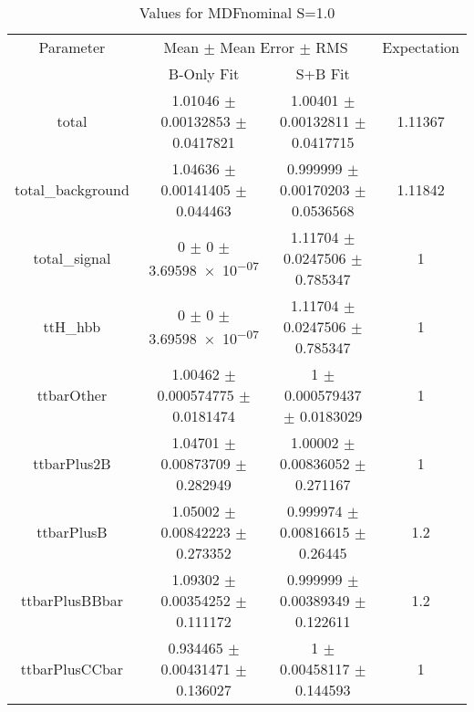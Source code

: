 \begin{table}
\centering
\caption{Values for MDFnominal S=1.0}
\begin{tabular}{cccc}
\toprule
Parameter & \multicolumn{2}{c}{Mean $\pm$ Mean Error $\pm$ RMS} & Expectation\\
 & B-Only Fit & S+B Fit & \\
\midrule
total & \num{1.01046} $\pm$ \num{0.00132853} $\pm$ \num{0.0417821} & \num{1.00401} $\pm$ \num{0.00132811} $\pm$ \num{0.0417715} & \num{1.11367}\\
total\_background & \num{1.04636} $\pm$ \num{0.00141405} $\pm$ \num{0.044463} & \num{0.999999} $\pm$ \num{0.00170203} $\pm$ \num{0.0536568} & \num{1.11842}\\
total\_signal & \num{0} $\pm$ \num{0} $\pm$ \num{3.69598e-07} & \num{1.11704} $\pm$ \num{0.0247506} $\pm$ \num{0.785347} & \num{1}\\
ttH\_hbb & \num{0} $\pm$ \num{0} $\pm$ \num{3.69598e-07} & \num{1.11704} $\pm$ \num{0.0247506} $\pm$ \num{0.785347} & \num{1}\\
ttbarOther & \num{1.00462} $\pm$ \num{0.000574775} $\pm$ \num{0.0181474} & \num{1} $\pm$ \num{0.000579437} $\pm$ \num{0.0183029} & \num{1}\\
ttbarPlus2B & \num{1.04701} $\pm$ \num{0.00873709} $\pm$ \num{0.282949} & \num{1.00002} $\pm$ \num{0.00836052} $\pm$ \num{0.271167} & \num{1}\\
ttbarPlusB & \num{1.05002} $\pm$ \num{0.00842223} $\pm$ \num{0.273352} & \num{0.999974} $\pm$ \num{0.00816615} $\pm$ \num{0.26445} & \num{1.2}\\
ttbarPlusBBbar & \num{1.09302} $\pm$ \num{0.00354252} $\pm$ \num{0.111172} & \num{0.999999} $\pm$ \num{0.00389349} $\pm$ \num{0.122611} & \num{1.2}\\
ttbarPlusCCbar & \num{0.934465} $\pm$ \num{0.00431471} $\pm$ \num{0.136027} & \num{1} $\pm$ \num{0.00458117} $\pm$ \num{0.144593} & \num{1}\\
\bottomrule
\end{tabular}
\end{table}